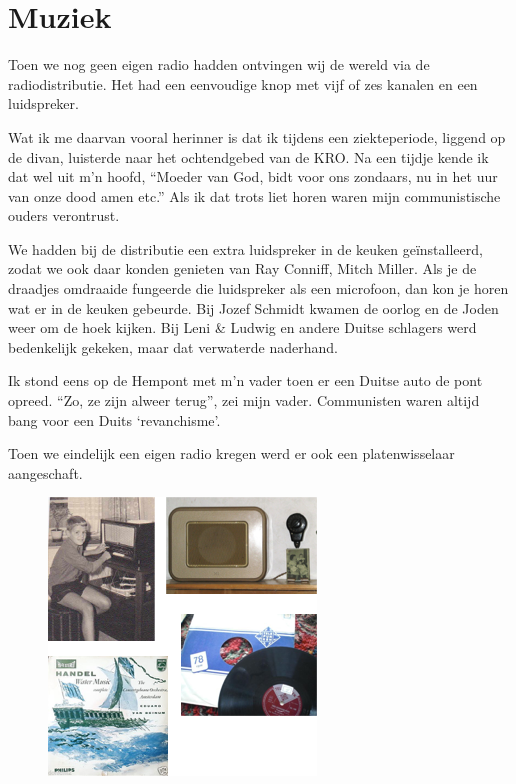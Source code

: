 \documentclass[12pt,twoside, openright]{memoir}
\begin{document}
\chapter{Muziek} %
\label{cha:muziek}

Toen we nog geen eigen radio hadden ontvingen wij de wereld via de radiodistributie. Het had een eenvoudige knop met vijf of zes kanalen en een luidspreker. 

Wat ik me daarvan vooral herinner is dat ik tijdens een ziekteperiode, liggend op de divan, luisterde naar het ochtendgebed van de KRO. Na een tijdje kende ik dat wel uit m’n hoofd, ``Moeder van God, bidt voor ons zondaars, nu in het uur van onze dood amen etc.'' Als ik dat trots liet horen waren mijn communistische ouders verontrust. 

We hadden bij de distributie een extra luidspreker in de keuken geïnstalleerd, zodat we ook daar konden genieten van Ray Conniff, Mitch Miller. Als je de draadjes omdraaide fungeerde die luidspreker als een microfoon, dan kon je horen wat er in de keuken gebeurde. Bij Jozef Schmidt kwamen de oorlog en de Joden weer om de hoek kijken. Bij Leni \& Ludwig en andere Duitse schlagers werd bedenkelijk gekeken, maar dat verwaterde naderhand. 

Ik stond eens op de Hempont met m’n vader toen er een Duitse auto de pont opreed. ``Zo, ze zijn alweer terug'', zei mijn vader. Communisten waren altijd bang voor een Duits `revanchisme’.

Toen we eindelijk een eigen radio kregen werd er ook een platenwisselaar aangeschaft. 

\begin{figure}
\includegraphics[width=\textwidth]{img/ch16/muziek}
\end{figure}
\end{document}
